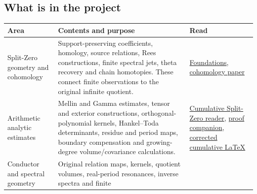 \documentclass[
]{article}
\newcounter{none} %
\begin{document}
\subsection{What is in the project}\label{what-is-in-the-project}

{\def\LTcaptype{none} %
\begin{longtable}[]{@{}
  >{\raggedright\arraybackslash}p{}
  >{\raggedright\arraybackslash}p{}
  >{\raggedright\arraybackslash}p{}@{}}
\toprule\noalign{}
\begin{minipage}[b]{\linewidth}\raggedright
Area
\end{minipage} & \begin{minipage}[b]{\linewidth}\raggedright
Contents and purpose
\end{minipage} & \begin{minipage}[b]{\linewidth}\raggedright
Read
\end{minipage} \\
\midrule\noalign{}
\endhead
\bottomrule\noalign{}
\endlastfoot
Split-Zero geometry and cohomology & Support-preserving coefficients,
homology, source relations, Rees constructions, finite spectral jets,
theta recovery and chain homotopies. These connect finite observations
to the original infinite quotient. &
\href{https://github.com/KokunoYumeto/zeta-function-research-reader/blob/main/RESEARCH_PROGRAMMES.md}{Foundations},
\href{https://zenodo.org/records/22865640/files/10-splitzero-cohomology-and-weight-control.pdf?download=1}{cohomology
paper} \\
Arithmetic analytic estimates & Mellin and Gamma estimates, tensor and
exterior constructions, orthogonal-polynomial kernels, Hankel--Toda
determinants, residue and period maps, boundary compensation and
growing-degree volume/covariance calculations. &
\href{https://zenodo.org/records/22865640/files/92-splitzero-cited-receiver-reader.pdf?download=1}{Cumulative
Split-Zero reader},
\href{https://zenodo.org/records/22865640/files/94-splitzero-cited-receiver-companion.pdf?download=1}{proof
companion},
\href{https://github.com/KokunoYumeto/zeta-function-research-reader/blob/666ee448d5ecb0bf8a4888f3a2aceaaa5c74d6d8/workbenches/splitzero-tandem/continuations/20260921-historical-proof-citations/README.md}{corrected
cumulative LaTeX} \\
Conductor and spectral geometry & Original relation maps, kernels,
quotient volumes, real-period resonances, inverse spectra and finite

\end{longtable}}
\end{document}
